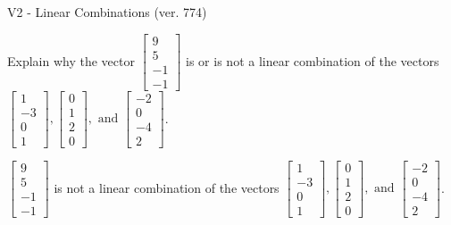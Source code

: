 \begin{exercise}
  \begin{exerciseTitle}V2 - Linear Combinations (ver. 774)\end{exerciseTitle}
  \begin{exerciseStatement}
    Explain why the vector \(\left[\begin{array}{c}
9 \\
5 \\
-1 \\
-1
\end{array}\right]\)  is or is not a linear 
	combination of the vectors \(\left[\begin{array}{c}
1 \\
-3 \\
0 \\
1
\end{array}\right] , \left[\begin{array}{c}
0 \\
1 \\
2 \\
0
\end{array}\right] , \text{ and } \left[\begin{array}{c}
-2 \\
0 \\
-4 \\
2
\end{array}\right]\).
	


  \end{exerciseStatement}
  \begin{exerciseAnswer}
   \(\left[\begin{array}{c}
9 \\
5 \\
-1 \\
-1
\end{array}\right]\) 
  	 is not  
	a linear combination of the vectors \(\left[\begin{array}{c}
1 \\
-3 \\
0 \\
1
\end{array}\right] , \left[\begin{array}{c}
0 \\
1 \\
2 \\
0
\end{array}\right] , \text{ and } \left[\begin{array}{c}
-2 \\
0 \\
-4 \\
2
\end{array}\right]\).

	
  


  \end{exerciseAnswer}
\end{exercise}